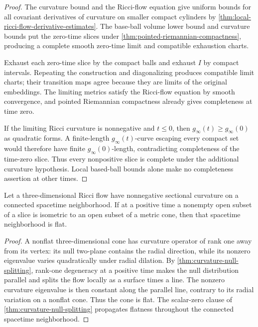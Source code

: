 \begin{proof}
The curvature bound and the Ricci-flow equation give uniform bounds for all
covariant derivatives of curvature on smaller compact cylinders by
\ref{thm:local-ricci-flow-derivative-estimates}.  The base-ball volume lower
bound and curvature bounds put the zero-time slices under
\ref{thm:pointed-riemannian-compactness}, producing a complete smooth
zero-time limit and compatible exhaustion charts.

Exhaust each zero-time slice by the compact balls and exhaust $I$ by compact
intervals.  Repeating the construction and diagonalizing produces compatible
limit charts; their transition maps agree because they are limits of the
original embeddings.  The limiting metrics satisfy the Ricci-flow equation
by smooth convergence, and pointed Riemannian compactness already gives
completeness at time zero.

If the limiting Ricci curvature is nonnegative and $t\le0$, then
$g_\infty(t)\ge g_\infty(0)$ as quadratic forms.  A finite-length
$g_\infty(t)$-curve escaping every compact set would therefore have finite
$g_\infty(0)$-length, contradicting completeness of the time-zero slice.
Thus every nonpositive slice is complete under the additional curvature
hypothesis.  Local based-ball bounds alone make no completeness assertion at
other times.
\end{proof}

\begin{lemma}
\label{lem:nonflat-terminal-cone-exclusion}
\notready
Let a three-dimensional Ricci flow have nonnegative sectional curvature on a
connected spacetime neighborhood.  If at a positive time a nonempty open
subset of a slice is isometric to an open subset of a metric cone, then that
spacetime neighborhood is flat.
\end{lemma}

\begin{proof}
A nonflat three-dimensional cone has curvature operator of rank one away
from its vertex: its null two-plane contains the radial direction, while its
nonzero eigenvalue varies quadratically under radial dilation.  By
\ref{thm:curvature-null-splitting}, rank-one degeneracy at a positive time
makes the null distribution parallel and splits the flow locally as a
surface times a line.  The nonzero curvature
eigenvalue is then constant along the parallel line, contrary to its radial
variation on a nonflat cone.  Thus the cone is flat.  The scalar-zero clause
of \ref{thm:curvature-null-splitting} propagates flatness throughout the
connected spacetime neighborhood.
\end{proof}

